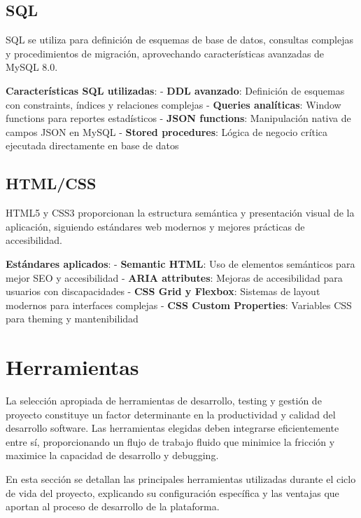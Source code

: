 \documentclass[12pt,a4paper,oneside]{report}
\begin{document}
\subsection{SQL}\label{sql}

SQL se utiliza para definición de esquemas de base de datos, consultas
complejas y procedimientos de migración, aprovechando características
avanzadas de MySQL 8.0.

\textbf{Características SQL utilizadas}: - \textbf{DDL avanzado}:
Definición de esquemas con constraints, índices y relaciones complejas -
\textbf{Queries analíticas}: Window functions para reportes estadísticos
- \textbf{JSON functions}: Manipulación nativa de campos JSON en MySQL -
\textbf{Stored procedures}: Lógica de negocio crítica ejecutada
directamente en base de datos

\subsection{HTML/CSS}\label{htmlcss}

HTML5 y CSS3 proporcionan la estructura semántica y presentación visual
de la aplicación, siguiendo estándares web modernos y mejores prácticas
de accesibilidad.

\textbf{Estándares aplicados}: - \textbf{Semantic HTML}: Uso de
elementos semánticos para mejor SEO y accesibilidad - \textbf{ARIA
attributes}: Mejoras de accesibilidad para usuarios con discapacidades -
\textbf{CSS Grid y Flexbox}: Sistemas de layout modernos para interfaces
complejas - \textbf{CSS Custom Properties}: Variables CSS para theming y
mantenibilidad

\section{Herramientas}\label{herramientas}

La selección apropiada de herramientas de desarrollo, testing y gestión
de proyecto constituye un factor determinante en la productividad y
calidad del desarrollo software. Las herramientas elegidas deben
integrarse eficientemente entre sí, proporcionando un flujo de trabajo
fluido que minimice la fricción y maximice la capacidad de desarrollo y
debugging.

En esta sección se detallan las principales herramientas utilizadas
durante el ciclo de vida del proyecto, explicando su configuración
específica y las ventajas que aportan al proceso de desarrollo de la
plataforma.
\end{document}
